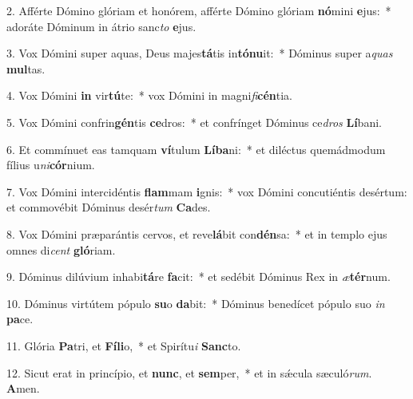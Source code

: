 2. Afférte Dómino glóriam et honórem, afférte Dómino glóriam \textbf{nó}mini \textbf{e}jus:~*  adoráte Dóminum in átrio sanc\textit{to} \textbf{e}jus.\

3. Vox Dómini super aquas, Deus majes\textbf{tá}tis in\textbf{tó}\textbf{nu}it:~*  Dóminus super a\textit{quas} \textbf{mul}tas.\

4. Vox Dómini \textbf{in} vir\textbf{tú}te:~*  vox Dómini in magni\textit{fi}\textbf{cén}tia.\

5. Vox Dómini confrin\textbf{gén}tis \textbf{ce}dros:~*  et confrínget Dóminus ce\textit{dros} \textbf{Lí}bani.\

6. Et commínuet eas tamquam \textbf{ví}tulum \textbf{Lí}\textbf{ba}ni:~*  et diléctus quemádmodum fílius u\textit{ni}\textbf{cór}nium.\

7. Vox Dómini intercidéntis \textbf{flam}mam \textbf{i}gnis:~*  vox Dómini concutiéntis desértum: et commovébit Dóminus desér\textit{tum} \textbf{Ca}des.\

8. Vox Dómini præparántis cervos, et reve\textbf{lá}bit con\textbf{dén}sa:~*  et in templo ejus omnes di\textit{cent} \textbf{gló}riam.\

9. Dóminus dilúvium inhabi\textbf{tá}re \textbf{fa}cit:~*  et sedébit Dóminus Rex in \textit{æ}\textbf{tér}num.\

10. Dóminus virtútem pópulo \textbf{su}o \textbf{da}bit:~*  Dóminus benedícet pópulo suo \textit{in} \textbf{pa}ce.\

11. Glória \textbf{Pa}tri, et \textbf{Fí}\textbf{li}o,~*  et Spirítu\textit{i} \textbf{Sanc}to.\

12. Sicut erat in princípio, et \textbf{nunc}, et \textbf{sem}per,~*  et in sǽcula sæculó\textit{rum}. \textbf{A}men.\

